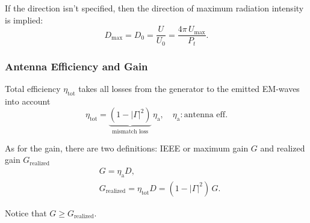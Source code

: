 If the direction isn't specified, then the direction of maximum radiation intensity is implied:
\begin{equation*}
D_{\mathrm{max}} = D_{0} = \dfrac{U}{U_{0}} = \dfrac{4\pi \, U_{\mathrm{max}}}{P_{t}}.
\end{equation*}

\subsubsection{Antenna Efficiency and Gain}
Total efficiency $\eta_{\mathrm{tot}}$ takes all losses from the generator to the emitted EM-waves into account
\begin{equation*}
  \eta_{{\mathrm{tot}}} = \underbrace{(1 - |\Gamma|^{2})}_{\text{mismatch loss}} \, \eta_{\mathrm{a}}, \quad \eta_{\mathrm{a}}:\text{antenna eff.}
\end{equation*}

As for the gain, there are two definitions: IEEE or maximum gain $G$ and realized gain $G_{\mathrm{realized}}$
\begin{align*}
  &G = \eta_{\mathrm{a}}D,\\
  &G_{\mathrm{realized}} = \eta_{\mathrm{tot}}D = (1 - |\Gamma|^{2})\,G.
\end{align*}

Notice that $G \geq G_{\mathrm{realized}}$.

